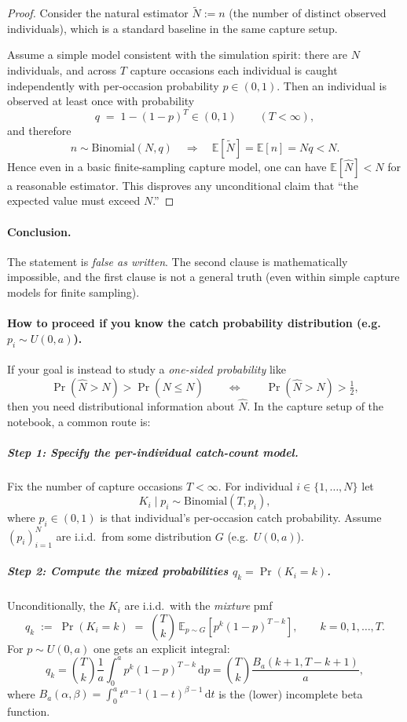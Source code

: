 \documentclass[11pt]{article}
\begin{document}
\begin{proof}
Consider the natural estimator $\tilde N := n$ (the number of distinct observed individuals), which is a standard baseline in the same capture setup.

Assume a simple model consistent with the simulation spirit: there are $N$ individuals, and across $T$ capture occasions each individual is caught independently with per-occasion probability $p\in(0,1)$. Then an individual is observed at least once with probability
\[
q \;=\; 1-(1-p)^T \in (0,1)\qquad (T<\infty),
\]
and therefore
\[
n \sim \mathrm{Binomial}(N,q)
\quad\Rightarrow\quad
\mathbb{E}[\tilde N]=\mathbb{E}[n]=Nq < N.
\]
Hence even in a basic finite-sampling capture model, one can have $\mathbb{E}[\hat N]<N$ for a reasonable estimator. This disproves any unconditional claim that ``the expected value must exceed $N$.'' 
\end{proof}

\paragraph{Conclusion.}
The statement is \emph{false as written}. The second clause is mathematically impossible, and the first clause is not a general truth (even within simple capture models for finite sampling).

\paragraph{How to proceed if you know the catch probability distribution (e.g.\ $p_i\sim U(0,a)$).}
If your goal is instead to study a \emph{one-sided probability} like
\[
\Pr(\hat N > N) > \Pr(\hat N \le N)
\qquad\Longleftrightarrow\qquad
\Pr(\hat N > N)>\tfrac12,
\]
then you need distributional information about $\hat N$. In the capture setup of the notebook, a common route is:

\subparagraph{Step 1: Specify the per-individual catch-count model.}
Fix the number of capture occasions $T<\infty$. For individual $i\in\{1,\dots,N\}$ let
\[
K_i \mid p_i \sim \mathrm{Binomial}(T,p_i),
\]
where $p_i\in(0,1)$ is that individual's per-occasion catch probability. Assume $(p_i)_{i=1}^N$ are i.i.d.\ from some distribution $G$ (e.g.\ $U(0,a)$).

\subparagraph{Step 2: Compute the mixed probabilities $q_k=\Pr(K_i=k)$.}
Unconditionally, the $K_i$ are i.i.d.\ with the \emph{mixture} pmf
\[
q_k \;:=\; \Pr(K_i=k)
\;=\;
\binom{T}{k}\,\mathbb{E}_{p\sim G}\!\left[p^k(1-p)^{T-k}\right],
\qquad k=0,1,\dots,T.
\]
For $p\sim U(0,a)$ one gets an explicit integral:
\[
q_k
=
\binom{T}{k}\frac{1}{a}\int_0^a p^k(1-p)^{T-k}\,\mathrm dp
=
\binom{T}{k}\frac{B_a(k+1,T-k+1)}{a},
\]
where $B_a(\alpha,\beta)=\int_0^a t^{\alpha-1}(1-t)^{\beta-1}\,\mathrm dt$ is the (lower) incomplete beta function.
\end{document}
